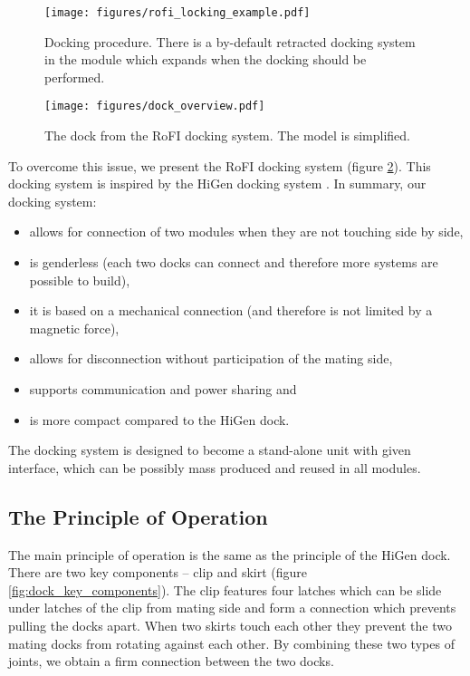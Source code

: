 \begin{figure}
    \centering
    \texttt{[image: figures/rofi\_locking\_example.pdf]}
    \caption{Docking procedure. There is a by-default retracted docking system
    in the module which expands when the docking should be performed.}
    \label{fig:rofi_locking_example}
\end{figure}


\begin{figure}
    \centering
    \texttt{[image: figures/dock\_overview.pdf]}
    \caption{The dock from the RoFI docking system. The model is simplified.}
    \label{fig:dock_overview}
\end{figure}

To overcome this issue, we present the RoFI docking system (figure
\ref{fig:dock_overview}). This docking system is inspired by the HiGen docking
system \cite{parrott_higen:_2014}. In summary, our docking system:
\begin{itemize}
    \item allows for connection of two modules when they are not touching side
    by side,
    \item is genderless (each two docks can connect and therefore more systems
    are possible to build),
    \item it is based on a mechanical connection (and therefore is not limited
    by a magnetic force),
    \item allows for disconnection without participation of the mating side,
    \item supports communication and power sharing and
    \item is more compact compared to the HiGen dock.
\end{itemize}

The docking system is designed to become a stand-alone unit with given
interface, which can be possibly mass produced and reused in all modules.

\subsection{The Principle of Operation}

The main principle of operation is the same as the principle of the HiGen dock.
There are two key components -- clip and skirt (figure
\ref{fig:dock_key_components}). The clip features four latches which can be
slide under latches of the clip from mating side and form a connection which
prevents pulling the docks apart. When two skirts touch each other they prevent
the two mating docks from rotating against each other. By combining these two
types of joints, we obtain a firm connection between the two docks.

